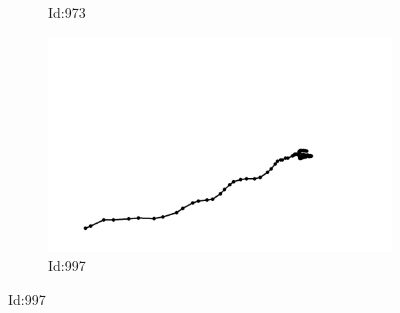 \documentclass[12pt,twoside]{report}
\begin{document}
\begin{figure}
\begin{subfigure}[b]{0.20\textwidth}
\caption{Id:973}
\end{subfigure}
\begin{subfigure}[b]{0.20\textwidth}
\centering
\includegraphics[width=\textwidth]{../trajectories/997.png}
\caption{Id:997}
\end{subfigure}
\end{figure}
\end{document}

